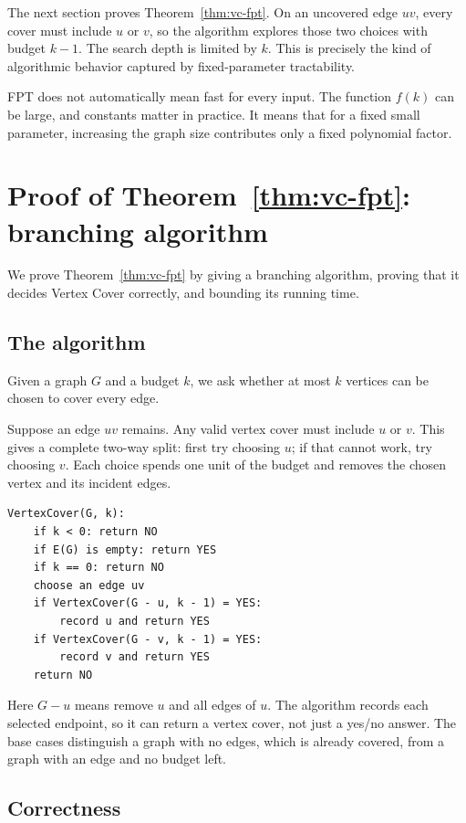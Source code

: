 \documentclass[11pt]{article}
\begin{document}
The next section proves Theorem~\ref{thm:vc-fpt}. On an uncovered edge $uv$, every cover must include $u$ or $v$, so the algorithm explores those two choices with budget $k-1$. The search depth is limited by $k$. This is precisely the kind of algorithmic behavior captured by fixed-parameter tractability.

FPT does not automatically mean fast for every input. The function $f(k)$ can be large, and constants matter in practice. It means that for a fixed small parameter, increasing the graph size contributes only a fixed polynomial factor.

\section{Proof of Theorem~\ref{thm:vc-fpt}: branching algorithm}

We prove Theorem~\ref{thm:vc-fpt} by giving a branching algorithm, proving that it decides Vertex Cover correctly, and bounding its running time.

\subsection{The algorithm}

Given a graph $G$ and a budget $k$, we ask whether at most $k$ vertices can be chosen to cover every edge.

Suppose an edge $uv$ remains. Any valid vertex cover must include $u$ or $v$. This gives a complete two-way split: first try choosing $u$; if that cannot work, try choosing $v$. Each choice spends one unit of the budget and removes the chosen vertex and its incident edges.

\begin{verbatim}
VertexCover(G, k):
    if k < 0: return NO
    if E(G) is empty: return YES
    if k == 0: return NO
    choose an edge uv
    if VertexCover(G - u, k - 1) = YES:
        record u and return YES
    if VertexCover(G - v, k - 1) = YES:
        record v and return YES
    return NO
\end{verbatim}

Here $G-u$ means remove $u$ and all edges of $u$. The algorithm records each selected endpoint, so it can return a vertex cover, not just a yes/no answer. The base cases distinguish a graph with no edges, which is already covered, from a graph with an edge and no budget left.

\subsection{Correctness}
\end{document}
